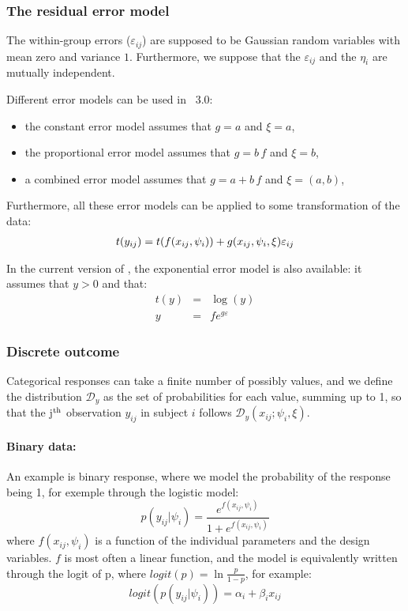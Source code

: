 \subsubsection*{The residual error model} %
The within-group errors ($\varepsilon_{ij}$)  are  supposed  to be  Gaussian random variables  with mean  zero and variance $1$.
Furthermore, we suppose that the $\varepsilon_{ij}$ and the $\eta_{i}$ are mutually independent.

Different error models can be used in \monolix~3.0:
\begin{itemize}
\item the constant error model assumes that $g=a$ and $\xi=a$,
\item the proportional error model assumes that $g=b\,f$ and $\xi=b$,
\item a combined error model assumes that $g=a+b\,f$ and $\xi=(a,b)$,
\end{itemize}

Furthermore, all these error models can be applied to some transformation of the data:
\begin{eqnarray}\label{def_t}
t(y_{ij})=t(f(x_{ij},{\psi_i}))+ g(x_{ij},{\psi_i},\xi)\varepsilon_{ij}
\end{eqnarray}

In the current version of \monolix, the exponential error model is also available: it assumes that $y>0$ and that:
\begin{eqnarray*}
t(y) &=& \log(y) \\
y&=&f e^{g\varepsilon}
\end{eqnarray*}

\subsubsection{Discrete outcome}

Categorical responses can take a finite number of possibly values, and we define the distribution $\mathcal{D}_y$ as the set of probabilities for each value, summing up to 1, so that the j$^{\rm th}$ observation $y_{ij}$ in subject $i$ follows $\mathcal{D}_y\left(x_{ij}; \psi_i, \xi \right)$. 

\paragraph{Binary data:} An example is binary response, where we model the probability of the response being 1, for exemple through the logistic model:
$$ p(y_{ij} | \psi_i) = \dfrac{e^{f(x_{ij}, \psi_i)}}{1+e^{f(x_{ij}, \psi_i)}} $$
where $f(x_{ij}, \psi_i)$ is a function of the individual parameters and the design variables. $f$ is most often a linear function, and the model is equivalently written through the logit of p, where $logit(p) = \ln \frac{p}{1-p}$, for example:
$$ logit(p(y_{ij} | \psi_i)) = \alpha_i + \beta_i x_{ij} $$

